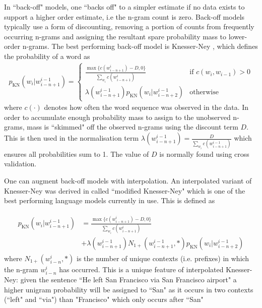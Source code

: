 In ``back-off" models, one ``backs off" to a simpler estimate if no data exists to support a higher order estimate, i.e the n-gram count is zero. Back-off models typically use a form of discounting, removing a portion of counts from frequently occurring n-grams and assigning the resultant spare probability mass to lower-order n-grams. The best performing back-off model is Knesser-Ney \cite{Chen1999} , which defines the probability of a word as 
\begin{align}
p_\text{KN}(w_i | w^{i-1}_{i-n+1}) = \left\{ \begin{array}{lr}
     \frac{\max\{c(w^i_{i-n+1}) - D, 0\}}{\sum_{w_i} c(w^i_{i-n+1})} & \text{if } c(w_i, w_{i-1}) > 0 \\
     \lambda(w^{i-1}_{i-n+1}) p_\text{KN}(w_i | w^{i-1}_{i-n+2}) & \text{otherwise}
 \end{array}
\right.
\end{align}
where $c(\cdot)$ denotes how often the word sequence was observed in the data. In order to accumulate enough probability mass to assign to the unobserved n-grams, mass is ``skimmed" off the observed n-grams using the discount term $D$. This is then used in the normalisation term $\lambda(w^{i-1}_{i-n+1}) = \frac{D}{\sum_{w_i} c(w^{i-1}_{i-n+1})}$ which ensures all probabilities sum to 1. The value of $D$ is normally found using cross validation.

One can augment back-off models with interpolation. An interpolated variant of Knesser-Ney was derived in\cite{Chen1999} called ``modified Knesser-Ney" which is one of the best performing language models currently in use. This is defined as

\begin{align}
\begin{split}
p_\text{KN}(w_i | w^{i-1}_{i-n+1}) & = 
\frac{\max\{c(w^i_{i-n+1}) - D, 0\}}{\sum_{w_i} c(w^i_{i-n+1})} \\
& + \lambda(w^{i-1}_{i-n+1}) N_{1+}(w^{i-1}_{i-n+1}, *) p_\text{KN}(w_i | w^{i-1}_{i-n+2})
\end{split}
\end{align}
where $N_{1+}(w^{i}_{i-n}, *)$ is the number of unique contexts (i.e. prefixes) in which the n-gram $w^{i}_{i-n}$ has occurred.  This is a unique feature of interpolated Knesser-Ney: given the sentence ``He left San Francisco via San Francisco airport" a higher unigram probability will be assigned to ``San" as it occurs in two contexts (``left" and ``via") than "Francisco" which only occurs after ``San"

